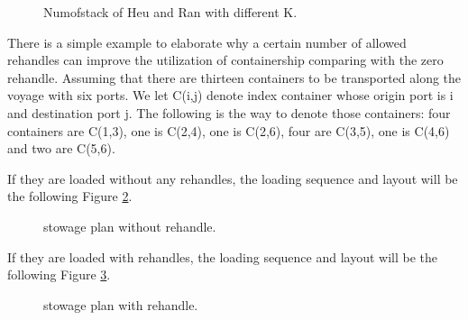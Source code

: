 \documentclass[review,3p,times,authoryear,12pt]{elsarticle}
\begin{document}
\begin{figure}[htbp]
\centering
\setlength{\abovecaptionskip}{10pt}
\caption{Numofstack of Heu and Ran with different K.}
\label{fig 2:graph}
\end{figure}

There is a simple example to elaborate why a certain number of allowed rehandles can improve the utilization of containership comparing with the zero rehandle.
Assuming that there are thirteen containers to be transported along the voyage with six ports.
We let C(i,j) denote index container whose origin port is i and destination port j.
The following is the way to denote those containers: four containers are C(1,3), one is C(2,4), one is C(2,6), four are C(3,5), one is C(4,6) and two are C(5,6).

If they are loaded without any rehandles, the loading sequence and layout will be the following Figure \ref{fig 3:graph}.
\begin{figure}[htbp]
\centering
\setlength{\abovecaptionskip}{10pt}
\caption{stowage plan without rehandle.}
\label{fig 3:graph}
\end{figure}


If they are loaded with rehandles, the loading sequence and layout will be the following Figure \ref{fig 4:graph}.
\begin{figure}[htbp]
\centering
\setlength{\abovecaptionskip}{10pt}
\caption{stowage plan with rehandle.}
\label{fig 4:graph}
\end{figure}
\end{document}
